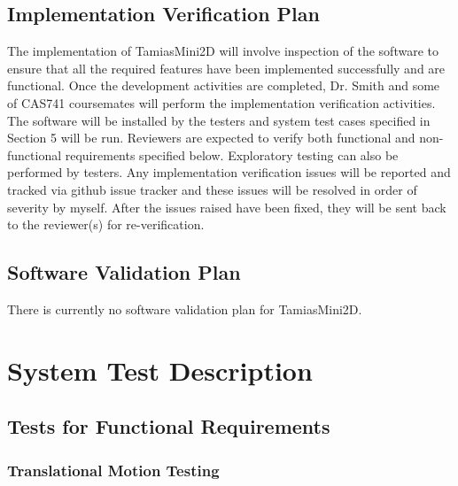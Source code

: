 \documentclass[12pt, titlepage]{article}
\begin{document}
\subsection{Implementation Verification Plan}
 The implementation of TamiasMini2D will involve inspection of the software to ensure that all the required features have been implemented successfully and are functional. Once the development activities are completed, Dr. Smith and some of CAS741 coursemates will perform the implementation verification activities. The software will be installed by the testers and system test cases specified in Section 5 will be run. Reviewers are expected to verify both functional and non-functional requirements specified below. Exploratory testing can also be performed by testers.
 Any implementation verification issues will be reported and tracked via github issue tracker and these issues will be resolved in order of severity by myself. After the issues raised have been fixed, they will be sent back to the reviewer(s) for re-verification.

\subsection{Software Validation Plan}

	There is currently no software validation plan for TamiasMini2D.


\section{System Test Description}
	
\subsection{Tests for Functional Requirements}



\subsubsection{Translational Motion Testing}
	
\end{document}
